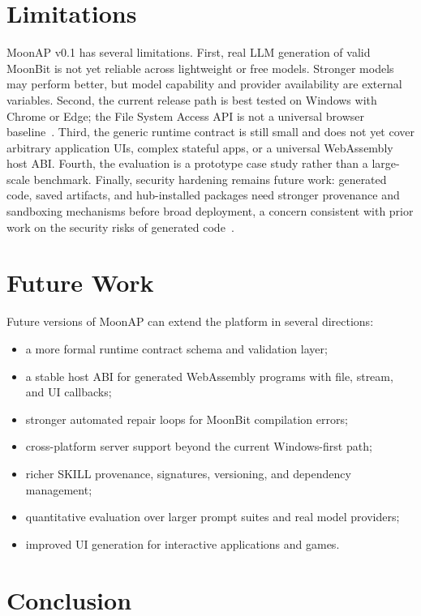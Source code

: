 \documentclass[11pt]{article}
\newcommand{\moonap}{MoonAP}
\newcommand{\skill}{SKILL}
\newcommand{\wasm}{WebAssembly}
\begin{document}
\section{Limitations}

\moonap{} v0.1 has several limitations. First, real LLM generation of valid MoonBit is not yet reliable across lightweight or free models. Stronger models may perform better, but model capability and provider availability are external variables. Second, the current release path is best tested on Windows with Chrome or Edge; the File System Access API is not a universal browser baseline~\cite{mdn-file-system-access}. Third, the generic runtime contract is still small and does not yet cover arbitrary application UIs, complex stateful apps, or a universal \wasm{} host ABI. Fourth, the evaluation is a prototype case study rather than a large-scale benchmark. Finally, security hardening remains future work: generated code, saved artifacts, and hub-installed packages need stronger provenance and sandboxing mechanisms before broad deployment, a concern consistent with prior work on the security risks of generated code~\cite{pearce2022asleep}.

\section{Future Work}

Future versions of \moonap{} can extend the platform in several directions:

\begin{itemize}[leftmargin=*]
  \item a more formal runtime contract schema and validation layer;
  \item a stable host ABI for generated \wasm{} programs with file, stream, and UI callbacks;
  \item stronger automated repair loops for MoonBit compilation errors;
  \item cross-platform server support beyond the current Windows-first path;
  \item richer \skill{} provenance, signatures, versioning, and dependency management;
  \item quantitative evaluation over larger prompt suites and real model providers;
  \item improved UI generation for interactive applications and games.
\end{itemize}

\section{Conclusion}
\end{document}
